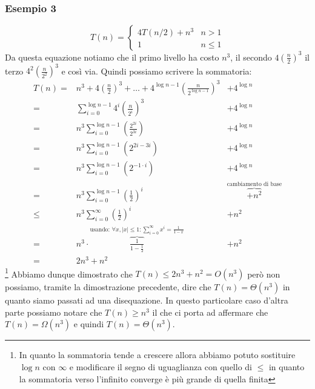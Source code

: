         \subsubsection{Esempio 3}
        $$
            T(n)=\begin{cases} 4T(n/2) + n^3 & n>1 \\ 1 & n\leq 1 \end{cases}
        $$
        Da questa equazione notiamo che il primo livello ha costo $ n^3 $, il secondo $ 4\left(\frac{n}{2}\right)^3 $ il terzo $ 4^2\left(\frac{n}{2^2}\right)^3 $ e così via. Quindi possiamo scrivere la sommatoria:
        $$
            \begin{aligned}
                T(n)=& n^3 + 4\left(\frac{n}{2}\right)^3 + \ldots + 4^{\log n-1}\left(\frac{n}{2^{\log n-1}}\right)^3 &+ 4^{\log n} \\
                =& \sum_{i=0}^{\log n-1}4^i\left(\frac{n}{2^i}\right)^3 & + 4^{\log n} \\
                =& n^3\sum_{i=0}^{\log n-1}\left(\frac{2^{2i}}{2^{3i}}\right) & + 4^{\log n} \\
                =& n^3\sum_{i=0}^{\log n-1}\left(2^{2i-3i}\right) & + 4^{\log n} \\
                =& n^3\sum_{i=0}^{\log n-1}\left(2^{-1\cdot i}\right) & + 4^{\log n} \\
                =& n^3\sum_{i=0}^{\log n-1}\left(\frac{1}{2}\right)^i & \overbrace{+n^2}^{\text{cambiamento di base}} \\
                \leq & n^3\sum_{i=0}^{\infty}\left(\frac{1}{2}\right)^i & +n^2 \\
                =& n^3\cdot \overbrace{\frac{1}{1-\frac{1}{2}}}^{\text{usando: }\forall x,|x|\leq 1:\sum_{i=0}^{\infty}x^i=\frac{1}{1-x}} & +n^2 \\
                =& 2n^3 + n^2
            \end{aligned}
        $$
        \footnote{In quanto la sommatoria tende a crescere allora abbiamo potuto sostituire $ \log n $ con $ \infty $ e modificare il segno di uguaglianza con quello di $ \leq $ in quanto la sommatoria verso l'infinito converge è più grande di quella finita}\newline
        Abbiamo dunque dimostrato che $ T(n) \leq 2n^3 + n^2 = O(n^3) $ però non possiamo, tramite la dimostrazione precedente, dire che $ T(n) = \Theta(n^3) $ in quanto siamo passati ad una disequazione. In questo particolare caso d'altra parte possiamo notare che $ T(n) \geq n^3 $ il che ci porta ad affermare che $ T(n) = \Omega(n^3) $ e quindi $ T(n) = \Theta(n^3) $. 
